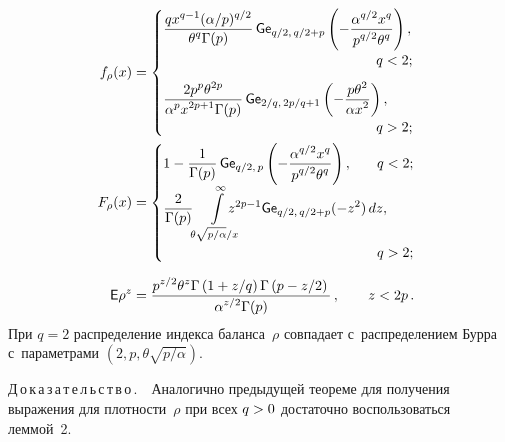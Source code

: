 \begin{multicols}{2}
\noindent
\begin{align*}
f_\rho(x) &=
 \begin{cases}
   \displaystyle \fr{q x^{q-1} (\alpha/p)^{q/2}}{{\theta^q  \Gamma(p)}} \,
{\sf Ge}_{q/2,\,q/2+p}\left(-\fr{ \alpha^{q/2} x^q}{p^{q/2}\theta^q}\right),\hspace*{-3.61624pt} 
&\\[2pt]
&\hspace*{-11mm}q < 2;\\[8pt]
   \displaystyle \fr{2p^p \theta^{2p}}{{\alpha^p x^{2p+1}\Gamma(p)}}\,{\sf Ge}_{2/q,\, 
2p/q+1} \left(-\fr{p\theta^2}{\alpha x^2}\right), &\\[2pt]
&\hspace*{-11mm}q > 2;
 \end{cases}
\\
F_\rho(x)& =
 \begin{cases}
   \displaystyle 1-\fr{1}{{\Gamma(p)}}\,{\sf Ge}_{q/2,\, p}\left(-
\fr{\alpha^{q/2}x^{q}}{p^{q/2}\theta^{q}}\right), &\hspace*{-6mm}q < 2;\\[2pt]
   \displaystyle \fr{2}{{\Gamma(p)}}
   \!\int\limits_{\theta\sqrt{p/\alpha}/x}^{\infty}\hspace*{-4mm} z^{2p-1}{\sf Ge}_{q/2,\, q/2+p} (-z^2) \,dz, &\\
&\hspace*{-6mm}q > 2;
 \end{cases}
\\[6pt]
\e\rho^z &= \fr{p^{z/2} \theta^z \Gamma\left(1+z/q\right) \Gamma\left(p-
z/2\right)}{{\alpha^{z/2}\Gamma(p)}}\,, \quad\enskip\enskip z<2p\,.
\end{align*}
При $q=2$ распределение индекса баланса~$\rho$ совпадает с~распределением 
Бурра~\cite{Burr1942} с~параметрами $(2, p, \theta \sqrt{p/\alpha})$.


\smallskip

\noindent
Д\,о\,к\,а\,з\,а\,т\,е\,л\,ь\,с\,т\,в\,о\,.\ \ Аналогично предыдущей тео\-ре\-ме для получения 
выражения для плотности~$\rho$ при всех $q\hm>0$ достаточно воспользоваться леммой~2.


\end{multicols}
